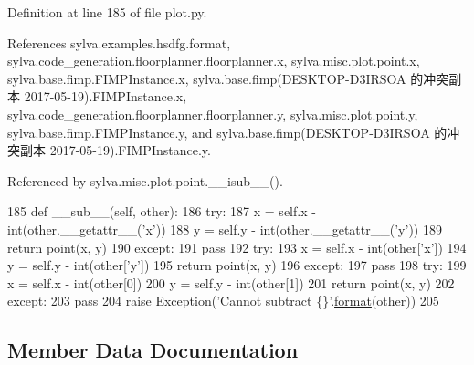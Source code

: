 Definition at line 185 of file plot.\+py.



References sylva.\+examples.\+hsdfg.\+format, sylva.\+code\+\_\+generation.\+floorplanner.\+floorplanner.\+x, sylva.\+misc.\+plot.\+point.\+x, sylva.\+base.\+fimp.\+F\+I\+M\+P\+Instance.\+x, sylva.\+base.\+fimp(\+D\+E\+S\+K\+T\+O\+P-\/\+D3\+I\+R\+S\+O\+A 的冲突副本 2017-\/05-\/19).\+F\+I\+M\+P\+Instance.\+x, sylva.\+code\+\_\+generation.\+floorplanner.\+floorplanner.\+y, sylva.\+misc.\+plot.\+point.\+y, sylva.\+base.\+fimp.\+F\+I\+M\+P\+Instance.\+y, and sylva.\+base.\+fimp(\+D\+E\+S\+K\+T\+O\+P-\/\+D3\+I\+R\+S\+O\+A 的冲突副本 2017-\/05-\/19).\+F\+I\+M\+P\+Instance.\+y.



Referenced by sylva.\+misc.\+plot.\+point.\+\_\+\+\_\+isub\+\_\+\+\_\+().


\begin{DoxyCode}
185         \textcolor{keyword}{def }\_\_sub\_\_(self, other):
186             \textcolor{keywordflow}{try}:
187                 x = self.x - int(other.\_\_getattr\_\_(\textcolor{stringliteral}{'x'}))
188                 y = self.y - int(other.\_\_getattr\_\_(\textcolor{stringliteral}{'y'}))
189                 \textcolor{keywordflow}{return} point(x, y)
190             \textcolor{keywordflow}{except}:
191                 \textcolor{keywordflow}{pass}
192             \textcolor{keywordflow}{try}:
193                 x = self.x - int(other[\textcolor{stringliteral}{'x'}])
194                 y = self.y - int(other[\textcolor{stringliteral}{'y'}])
195                 \textcolor{keywordflow}{return} point(x, y)
196             \textcolor{keywordflow}{except}:
197                 \textcolor{keywordflow}{pass}
198             \textcolor{keywordflow}{try}:
199                 x = self.x - int(other[0])
200                 y = self.y - int(other[1])
201                 \textcolor{keywordflow}{return} point(x, y)
202             \textcolor{keywordflow}{except}:
203                 \textcolor{keywordflow}{pass}
204             \textcolor{keywordflow}{raise} Exception(\textcolor{stringliteral}{'Cannot subtract \{\}'}.\hyperlink{namespacesylva_1_1examples_1_1hsdfg_ab3510a0b8457362330aa4d9fd2209590}{format}(other))
205 
\end{DoxyCode}


\subsection{Member Data Documentation}
\mbox{\label{classsylva_1_1misc_1_1plot_1_1point_a268ceb8acaa96e215d84447421cbadc0}} 
